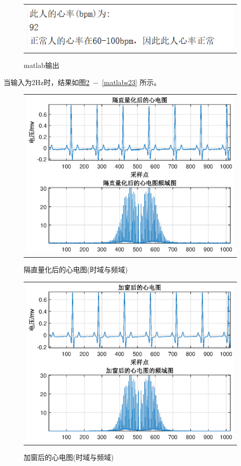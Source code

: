 \documentclass[12pt]{article}
\begin{document}
\begin{figure}[htbp]
  \centering
  \begin{tabular}{c}
  \includegraphics[width=.8\textwidth]{x1}
  \end{tabular}
  \caption{matlab输出}\label{matlabs13}
\end{figure}\par
当输入为2Hz时，结果如图\ref{matlabs21}\ $-$\ \ref{matlabs23}
所示。
\begin{figure}[htbp]
  \centering
  \begin{tabular}{c}
  \includegraphics[width=.8\textwidth]{g2}
  \end{tabular}
  \caption{隔直量化后的心电图(时域与频域)}\label{matlabs21}
\end{figure}
\begin{figure}[htbp]
  \centering
  \begin{tabular}{c}
  \includegraphics[width=.8\textwidth]{j2}
  \end{tabular}
  \caption{加窗后的心电图(时域与频域)}\label{matlabs22}
\end{figure}
\end{document}

